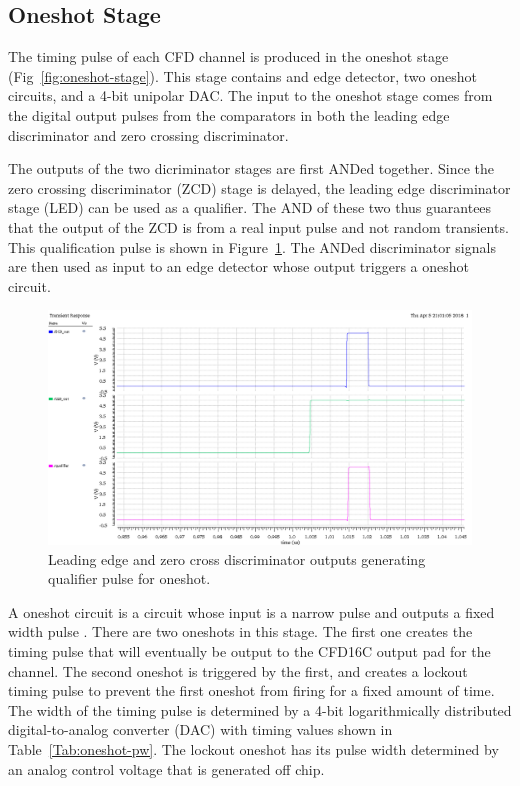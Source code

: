 \documentclass[12pt,oneside,final]{siuethesis}
\theoremstyle{definition}
\begin{document}
\subsection{Oneshot Stage}
\par The timing pulse of each CFD channel is produced in the oneshot stage (Fig~\ref{fig:oneshot-stage}). This stage contains and edge detector, two oneshot circuits, and a 4-bit unipolar DAC. The input to the oneshot stage comes from the digital output pulses from the comparators in both the leading edge discriminator and zero crossing discriminator. 
\par The outputs of the two dicriminator stages are first ANDed together. Since the zero crossing discriminator (ZCD) stage is delayed, the leading edge discriminator stage (LED) can be used as a qualifier. The AND of these two thus guarantees that the output of the ZCD is from a real input pulse and not random transients. This qualification pulse is shown in Figure~\ref{fig:qualifier}. The ANDed discriminator signals are then used as input to an edge detector whose output triggers a oneshot circuit.
\begin{figure}[ht]
\centering
\includegraphics[scale=.4,keepaspectratio=true]{images/qualifier.png} 
\caption{Leading edge and zero cross discriminator outputs generating qualifier pulse for oneshot.}
\label{fig:qualifier}
\end{figure}
\par A oneshot circuit is a circuit whose input is a narrow pulse and outputs a fixed width pulse \cite{ONESHOT}. There are two oneshots in this stage. The first one creates the timing pulse that will eventually be output to the CFD16C output pad for the channel. The second oneshot is triggered by the first, and creates a lockout timing pulse to prevent the first oneshot from firing for a fixed amount of time. The width of the timing pulse is determined by a 4-bit logarithmically distributed digital-to-analog converter (DAC) with timing values shown in Table~\ref{Tab:oneshot-pw}. The lockout oneshot has its pulse width determined by an analog control voltage that is generated off chip.
\end{document}
